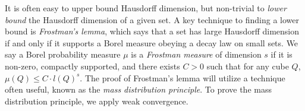 It is often easy to upper bound Hausdorff dimension, but non-trivial to \emph{lower bound} the Hausdorff dimension of a given set. A key technique to finding a lower bound is \emph{Frostman's lemma}, which says that a set has large Hausdorff dimension if and only if it supports a Borel measure obeying a decay law on small sets. We say a Borel probability measure $\mu$ is a \emph{Frostman measure} of dimension $s$ if it is non-zero, compactly supported, and there exists $C > 0$ such that for any cube $Q$, $\mu(Q) \leq C \cdot l(Q)^s$. The proof of Frostman's lemma will utilize a technique often useful, known as the \emph{mass distribution principle}. To prove the mass distribution principle, we apply weak convergence.

\begin{comment}

\begin{lemma}
	For each $k \geq 0$, let $\mathcal{E}_k$ be a finite collection of non-empty, compact, disjoint subsets of $\RR^d$, such that for each $A \in \mathcal{E}_{k+1}$, there is a unique $A^* \in \mathcal{E}_k$ such that $A \subset A^*$, and for any $A^* \in \mathcal{E}_k$, there is at least one $A \in \mathcal{E}_{k+1}$ with $A \subset A^*$. Let $E_k = \bigcup \mathcal{E}_k$, and let $E_\infty = \bigcap E_k$. Let $\mu: \bigcup_{k \geq 0} \mathcal{E}_k \to [0,\infty)$ be a function such that for any $i$, and for any $A \in \mathcal{E}_i$,
	\begin{equation} \label{equation124069350740597} \mu(A) = \sum \{ \mu(B) : B \in \mathcal{E}_{i+1}, B \subset A \}. \end{equation}
	Then $\mu$ extends to a finite Borel measure on $\RR^d$ supported on $E_\infty$.
\end{lemma}
\begin{proof}
	Let $\mathcal{E} = \bigcup_{k \geq 0} \mathcal{E}_k \cup \mathcal{P}(\RR^d - E_k)$. Then $\mathcal{E}$ is a \emph{semi-ring} of sets:
	\begin{itemize}
		\item \emph{$\mathcal{E}$ is closed under intersections}: Let $A, B \in \mathcal{E}$. Then without loss of generality, swapping $A$ and $B$ if necessary, there exists $i \leq j$ such that $A \in \mathcal{E}_i$ or $A \subset \RR^d - E_i$, and $B \in \mathcal{E}_j$ or $B \subset \RR^d - E_j$.

		If $A \in \mathcal{E}_i$, and $B \in \mathcal{E}_j$, then either $A \cap B = \emptyset$, or $B \subset A$, and $A \cap B = B$. In either case, $A \cap B \in \mathcal{E}$.


\end{comment}
